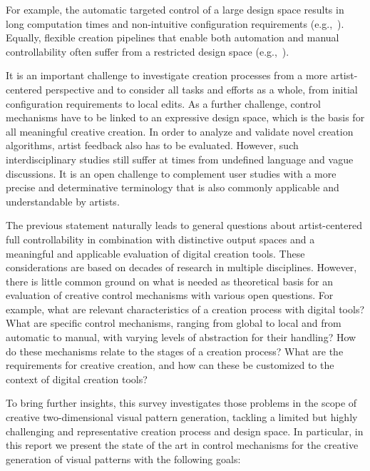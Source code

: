 For example, the automatic targeted control of a large design space results in long computation times and non-intuitive configuration requirements (e.g.,~\cite{bourque_2004_ptm, wong_1998_cgf}). Equally, flexible creation pipelines that enable both automation and manual controllability often suffer from a restricted design space (e.g.,~\cite{santoni_2016_ggp}).  

It is an important challenge to investigate creation processes from a more artist-centered perspective and to consider all tasks and efforts as a whole, from initial configuration requirements to local edits. As a further challenge, control mechanisms have to be linked to an expressive design space, which is the basis for all meaningful creative creation. In order to analyze and validate novel creation algorithms, artist feedback also has to be evaluated. However, such interdisciplinary studies still suffer at times from undefined language and vague discussions. It is an open challenge to complement user studies with a more precise and determinative terminology that is also commonly applicable and understandable by artists.

The previous statement naturally leads to general questions about artist-centered full controllability in combination with distinctive output spaces and a meaningful and applicable evaluation of digital creation tools. These considerations are based on decades of research in multiple disciplines. However, there is little common ground on what is needed as theoretical basis for an evaluation of creative control mechanisms with various open questions. For example, what are relevant characteristics of a creation process with digital tools? What are specific control mechanisms, ranging from global to local and from automatic to manual, with varying levels of abstraction for their handling? How do these mechanisms relate to the stages of a creation process? What are the requirements for creative creation, and how can these be customized to the context of digital creation tools?

To bring further insights, this survey investigates those problems in the scope of creative two-dimensional visual pattern generation, tackling a limited but highly challenging and representative creation process and design space. In particular, in this report we present the state of the art in control mechanisms for the creative generation of visual patterns with the following goals:

